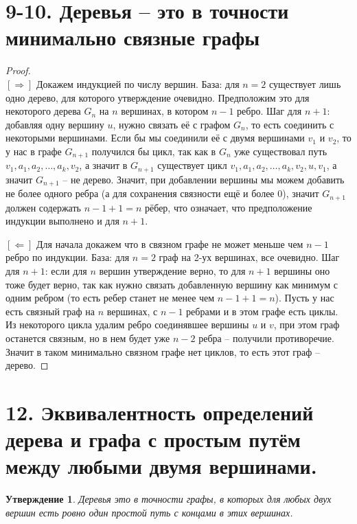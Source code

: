 \documentclass[a4paper,12pt]{article}
\newtheorem*{Statements}{Утверждение}
\begin{document}
    \section*{9-10. Деревья -- это в точности минимально связные графы}
    \begin{proof}\ \\
        $[\Rightarrow]$ Докажем индукцией по числу вершин. База: для $n = 2$ существует лишь одно дерево, для которого утверждение очевидно. Предположим это для некоторого дерева $G_{n}$ на $n$ вершинах, в котором $n - 1$ ребро. Шаг для $n + 1$: добавляя одну вершину $u$, нужно связать её с графом $G_{n}$, то есть соединить с некоторыми вершинами. Если бы мы соединили её с двумя вершинами $v_{1}$ и $v_{2}$, то у нас в графе $G_{n+1}$ получился бы цикл, так как в $G_{n}$ уже существовал путь $v_{1}, a_{1}, a_{2},\ldots, a_{k}, v_{2}$, а значит в $G_{n+1}$ существует цикл $v_{1}, a_{1}, a_{2},\ldots, a_{k}, v_{2}, u, v_{1}$, а значит $G_{n+1}$ -- не дерево. Значит, при добавлении вершины мы можем добавить не более одного ребра (а для сохранения связности ещё и более 0), значит $G_{n+1}$ должен содержать $n - 1 + 1 = n$ рёбер, что означает, что предположение индукции выполнено и для $n + 1$.
        
        \noindent$[\Leftarrow]$ Для начала докажем что в связном графе не может меньше чем $n - 1$ ребро по индукции. База: для $n = 2$ граф на 2-ух вершинах, все очевидно. Шаг для $n + 1$: если для $n$ вершин утверждение верно, то для $n + 1$ вершины оно тоже будет верно, так как нужно связать добавленную вершину как минимум с одним ребром (то есть ребер станет не менее чем $n - 1 + 1 = n$). Пусть у нас есть связный граф на $n$ вершинах, с $n - 1$ ребрами и в этом графе есть циклы. Из некоторого цикла удалим ребро соединявшее вершины $u$ и $v$, при этом граф останется связным, но в нем будет уже $n - 2$ ребра -- получили противоречие. Значит в таком минимально связном графе нет циклов, то есть этот граф -- дерево.
    \end{proof}
    

    \section*{12. Эквивалентность определений дерева и графа с простым путём
    между любыми двумя вершинами.}
    \begin{Statements}
        Деревья это в точности графы, в которых для любых двух вершин есть ровно
        один простой путь с концами в этих вершинах.
    \end{Statements}
\end{document}
